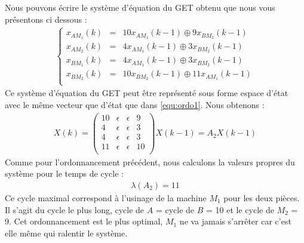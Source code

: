 Nous pouvons écrire le système d'équation du GET obtenu que nous vous présentons ci dessous :
\begin{align*}%
\left\lbrace
\begin{array}{lcl}
x_{AM_1}(k)&=& 10x_{AM_1}(k-1) \oplus  9x_{BM_2}(k-1)\\
x_{AM_2}(k)&=&  4x_{AM_1}(k-1) \oplus  3x_{BM_2}(k-1)\\
x_{BM_1}(k)&=&  4x_{AM_1}(k-1) \oplus  3x_{BM_2}(k-1)\\
x_{BM_2}(k)&=& 10x_{BM_2}(k-1) \oplus 11x_{AM_1}(k-1)\\
\end{array}
\right.
\end{align*}
Ce système d'équation du GET peut être représenté sous forme espace d'état avec le même vecteur que d'état que dans \ref{equ:ordo1}. Nous obtenons :
\begin{align}\label{eqn:eeOrdo3}
X(k) = \begin{pmatrix}
10 & \epsilon &\epsilon & 9\\
4 &\epsilon &\epsilon & 3\\
4 &\epsilon &\epsilon & 3\\
11 &\epsilon &\epsilon & 10\\
\end{pmatrix}X(k-1) = A_2X(k-1)
\end{align} 
Comme pour l'ordonnancement précédent, nous calculons la valeurs propres du système pour le temps de cycle : 
\begin{eqnarray*}
\lambda(A_2) = 11  
\end{eqnarray*}
Ce cycle maximal correspond à l'usinage de la machine $M_1$ pour les deux pièces. Il s'agit du cycle le plus long, cycle de $A$ = cycle de $B$ = 10 et le cycle de $M_2$ = 9. Cet ordonnancement est le plus optimal, $M_1$ ne va jamais s'arrêter car c'est elle même qui ralentir le système. 
